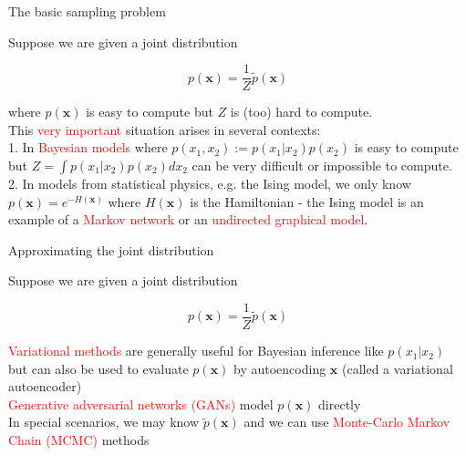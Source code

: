 \documentclass{beamer}					%
\begin{document}
\begin{frame}{The basic sampling problem}

Suppose we are given a joint distribution

\begin{equation*}
p(\mathbf{x}) = \frac{1}{Z}\tilde{p}(\mathbf{x})
\end{equation*}

where $p(\mathbf{x})$ is easy to compute but $Z$ is (too) hard to compute.\\
\vspace{0.1in}
This \textcolor{red}{very important} situation arises in several contexts:\\
\vspace{0.1in}
1. In \textcolor{red}{Bayesian models} where $p(x_{1},x_{2}) := p(x_{1}|x_{2})p(x_{2})$ is easy to compute but
$Z = \int p(x_{1}|x_{2})p(x_{2})dx_{2}$ can be very difficult or impossible to
compute.\\
\vspace{0.1in}
2. In models from statistical physics, e.g. the Ising model, we only know
$p(\mathbf{x}) = e^{−H(\mathbf{x})}$ where $H(\mathbf{x})$ is the Hamiltonian
- the Ising model is an example of a \textcolor{red}{Markov network} or an \textcolor{red}{undirected graphical model}.

\end{frame}

\begin{frame}{Approximating the joint distribution}

Suppose we are given a joint distribution

\begin{equation*}
p(\mathbf{x}) = \frac{1}{Z}\tilde{p}(\mathbf{x})
\end{equation*}
 
\textcolor{red}{Variational methods} are generally useful for Bayesian inference like $p(x_{1}|x_{2})$ but can also be used to evaluate $p(\mathbf{x})$ by autoencoding $\mathbf{x}$ (called a variational autoencoder)\\
\vspace{0.1in}
\textcolor{red}{Generative adversarial networks (GANs)} model $p(\mathbf{x})$ directly\\
\vspace{0.1in}
In special scenarios, we may know $\tilde{p}(\mathbf{x})$ and we can use \textcolor{red}{Monte-Carlo Markov Chain (MCMC)} methods

\end{frame}
\end{document}

